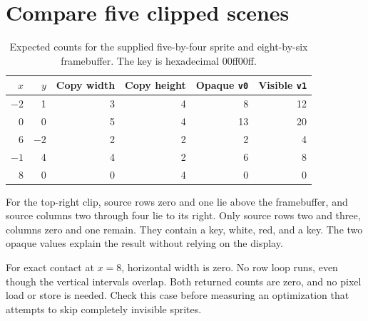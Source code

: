 \section{Compare five clipped scenes}\label{blit-x-trace}
\begin{table}[htbp]
  \centering
  \caption{Expected counts for the supplied five-by-four sprite and eight-by-six framebuffer. The key is hexadecimal 00ff00ff.}
  \begin{tabular}{rrrrrr}
    \toprule
    $x$  & $y$  & Copy width & Copy height & Opaque \texttt{v0} & Visible \texttt{v1} \\
    \midrule
    $-2$ & 1    & 3          & 4           & 8                  & 12                  \\
    0    & 0    & 5          & 4           & 13                 & 20                  \\
    6    & $-2$ & 2          & 2           & 2                  & 4                   \\
    $-1$ & 4    & 4          & 2           & 6                  & 8                   \\
    8    & 0    & 0          & 4           & 0                  & 0                   \\
    \bottomrule
  \end{tabular}
\end{table}
For the top-right clip, source rows zero and one lie above the framebuffer,
and source columns two through four lie to its right. Only source rows two
and three, columns zero and one remain. They contain a key, white, red, and
a key. The two opaque values explain the result without relying on the display.

For exact contact at $x=8$, horizontal width is zero. No row loop runs, even
though the vertical intervals overlap. Both returned counts are zero, and no
pixel load or store is needed. Check this case before measuring an optimization
that attempts to skip completely invisible sprites.
